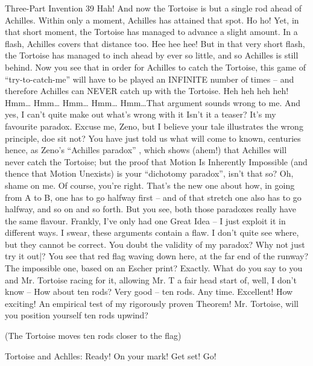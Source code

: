 Three-Part Invention                                                                           39
\achilles Hah!
\zeno And now the Tortoise is but a single rod ahead of Achilles. Within only a moment,
      Achilles has attained that spot.
\achilles Ho ho!
\zeno Yet, in that short moment, the Tortoise has managed to advance a slight amount. In a
      flash, Achilles covers that distance too.
\achilles Hee hee hee!
\zeno But in that very short flash, the Tortoise has managed to inch ahead by ever so little, and
      so Achilles is still behind. Now you see that in order for Achilles to catch the Tortoise,
      this game of “try-to-catch-me” will have to be played an INFINITE number of times –
      and therefore Achilles can NEVER catch up with the Tortoise.
\tortoise Heh heh heh heh!
\achilles Hmm… Hmm… Hmm… Hmm… Hmm…That argument sounds wrong to me.
      And yes, I can’t quite make out what’s wrong with it
\zeno Isn’t it a teaser? It’s my favourite paradox.
\tortoise Excuse me, Zeno, but I believe your tale illustrates the wrong principle, doe sit
      not? You have just told us what will come to known, centuries hence, as Zeno’s “Achilles
      paradox” , which shows (ahem!) that Achilles will never catch the Tortoise; but the proof
      that Motion Is Inherently Impossible (and thence that Motion Unexists) is your
      “dichotomy paradox”, isn’t that so?
\zeno Oh, shame on me. Of course, you’re right. That’s the new one about how, in going from
      A to B, one has to go halfway first – and of that stretch one also has to go halfway, and so
      on and so forth. But you see, both those paradoxes really have the same flavour. Frankly,
      I’ve only had one Great Idea – I just exploit it in different ways.
\achilles I swear, these arguments contain a flaw. I don’t quite see where, but they cannot
      be correct.
\zeno You doubt the validity of my paradox? Why not just try it out|? You see that red flag
      waving down here, at the far end of the runway?
\achilles The impossible one, based on an Escher print?
\zeno Exactly. What do you say to you and Mr. Tortoise racing for it, allowing Mr. T a fair
      head start of, well, I don’t know –
\tortoise How about ten rods?
\zeno Very good – ten rods.
\achilles Any time.
\zeno Excellent! How exciting! An empirical test of my rigorously proven Theorem! Mr.
      Tortoise, will you position yourself ten rods upwind?

(The Tortoise moves ten rods closer to the flag)

Tortoise and Achlles: Ready!
\zeno On your mark! Get set! Go!




